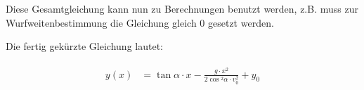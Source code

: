\noindent Diese Gesamtgleichung kann nun zu Berechnungen benutzt werden, z.B. muss zur Wurfweitenbestimmung die Gleichung gleich $0$ gesetzt werden. 

Die fertig gekürzte Gleichung lautet:

\begin{align}
\begin{split}
	y(x) &= \tan{\alpha} \cdot x - \frac{g \cdot x^2}{2\cos{^2\alpha} \cdot v_0^2} + y_0
\end{split}
\end{align}